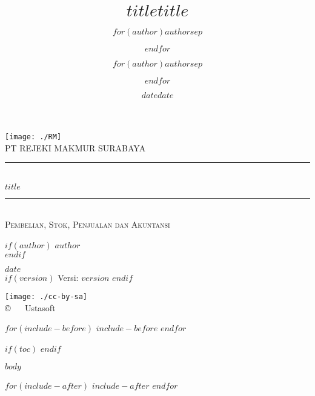 \documentclass[a4,11pt]{$documentclass$}
\title{$title$}
\author{$for(author)$$author$$sep$ \and $endfor$}
\date{$date$}
\title{$title$}
\author{$for(author)$$author$$sep$ \and $endfor$}
\date{$date$}
\newcommand{\HRule}{\rule{\linewidth}{0.5mm}}
\begin{document}
\begin{titlepage}


    \begin{center}


        \texttt{[image: ./RM]}\\[3cm]    

        \textsc{\LARGE PT REJEKI MAKMUR SURABAYA}\\[0.5cm]

        \HRule \\[0.4cm]
        { \huge \bfseries $title$}\\[0.4cm]

        \HRule \\[0.5cm]

        \textsc{\Large Pembelian, Stok, Penjualan dan Akuntansi}\\[2cm]

        \begin{minipage}{0.8\textwidth}
            \begin{flushright} \large
                $if(author)$
                    \emph{$author$} \\
                $endif$
                
                \emph{$date$} \\
                
                $if(version)$
                    {Versi:} \textsc{$version$}
                $endif$
                
            \end{flushright}
        \end{minipage}

        \vfill

        \texttt{[image: ./cc-by-sa]} \\
        {\large \copyright ~ \the\year ~ Ustasoft}
    \end{center}

\end{titlepage}

$for(include-before)$
    $include-before$
$endfor$

$if(toc)$
{
    \hypersetup{linkcolor=black}
    \tableofcontents
}
$endif$

\newpage
{}

$body$


$for(include-after)$
    $include-after$
$endfor$
\end{document}
